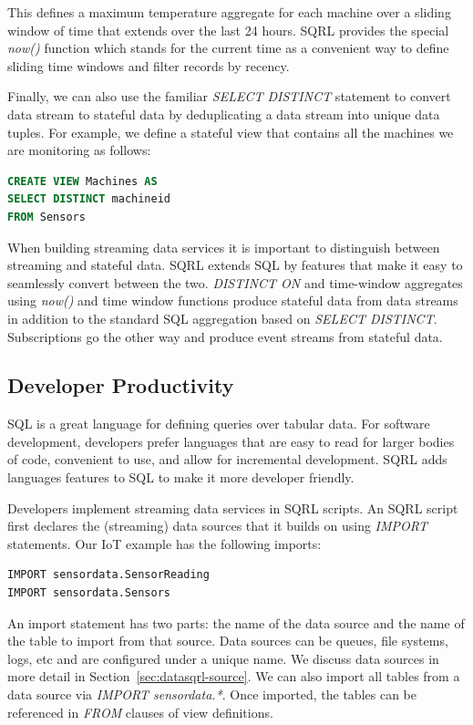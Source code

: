 \documentclass[	DIV=calc,%
							paper=letter,%
							fontsize=11pt,%
							twocolumn]{scrartcl}	 					%
\begin{document}
This defines a maximum temperature aggregate for each machine over a sliding window of time that extends over the last 24 hours. SQRL provides the special \emph{now()} function which stands for the current time as a convenient way to define sliding time windows and filter records by recency.

Finally, we can also use the familiar \emph{SELECT DISTINCT} statement to convert data stream to stateful data by deduplicating a data stream into unique data tuples. For example, we define a stateful view that contains all the machines we are monitoring as follows:
\begin{lstlisting}[language=SQL]
CREATE VIEW Machines AS
SELECT DISTINCT machineid
FROM Sensors
\end{lstlisting}

When building streaming data services it is important to distinguish between streaming and stateful data. SQRL extends SQL by features that make it easy to seamlessly convert between the two. \emph{DISTINCT ON} and time-window aggregates using \emph{now()} and time window functions produce stateful data from data streams in addition to the standard SQL aggregation based on \emph{SELECT DISTINCT}. Subscriptions go the other way and produce event streams from stateful data.


\subsection{Developer Productivity}

SQL is a great language for defining queries over tabular data. For software development, developers prefer languages that are easy to read for larger bodies of code, convenient to use, and allow for incremental development. SQRL adds languages features to SQL to make it more developer friendly.

Developers implement streaming data services in SQRL scripts. An SQRL script first declares the (streaming) data sources that it builds on using \emph{IMPORT} statements. Our IoT example has the following imports:
\begin{lstlisting}[language=SQL]
IMPORT sensordata.SensorReading
IMPORT sensordata.Sensors
\end{lstlisting}

An import statement has two parts: the name of the data source and the name of the table to import from that source. Data sources can be queues, file systems, logs, etc and are configured under a unique name. We discuss data sources in more detail in Section~\ref{sec:datasqrl-source}.
We can also import all tables from a data source via \emph{IMPORT sensordata.*}. Once imported, the tables can be referenced in \emph{FROM} clauses of view definitions.
\end{document}
